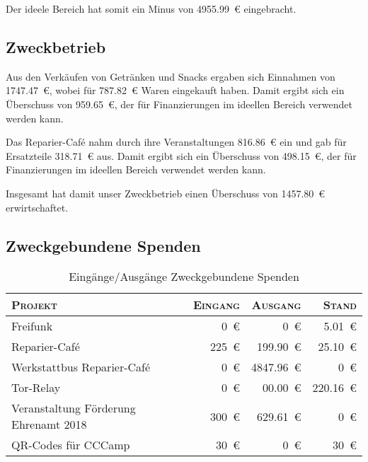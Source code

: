 \documentclass[ngerman]{scrartcl}
\begin{document}
Der ideele Bereich hat somit ein Minus von \num{4955.99}~\euro{} eingebracht.
\newpage
\subsection{Zweckbetrieb}
\label{sec:Zweckbetrieb}
Aus den Verkäufen von Getränken und Snacks ergaben sich Einnahmen von \num{1747,47}~\euro{}, wobei für \num{787,82}~\euro{} Waren eingekauft haben.
Damit ergibt sich ein Überschuss von \num{959,65}~\euro{}, der für Finanzierungen im ideellen Bereich verwendet werden kann.

Das Reparier-Café nahm durch ihre Veranstaltungen \num{816,86}~\euro{} ein und gab für Ersatzteile \num{318,71}~\euro{} aus.
Damit ergibt sich ein Überschuss von \num{498,15}~\euro{}, der für Finanzierungen im ideellen Bereich verwendet werden kann.

Insgesamt hat damit unser Zweckbetrieb einen Überschuss von \num{1457,80}~\euro{} erwirtschaftet.

\subsection{Zweckgebundene Spenden}
\label{sec:zweckgebundene_spenden}

\begin{table}[h]
        \centering
        \begin{tabular}{l|r|r|r}
        \toprule
        \textsc{Projekt} & \textsc{Eingang} & \textsc{Ausgang} & \textsc{Stand} \\
        \midrule
        Freifunk & \num{0}~\euro{} & \num{0}~\euro{} & \num{5,01}~\euro{} \\
        Reparier-Café & \num{225}~\euro{} & \num{199,90}~\euro{} & \num{25,10}~\euro{} \\
        Werkstattbus Reparier-Café & \num{0}~\euro{} & \num{4847,96}~\euro{} & \num{0}~\euro{} \\
        Tor-Relay & \num{0}~\euro{} & \num{00,00}~\euro{} & \num{220,16}~\euro{} \\
        Veranstaltung Förderung Ehrenamt 2018 & \num{300}~\euro{} & \num{629,61}~\euro{} & \num{0}~\euro{} \\
        QR-Codes für CCCamp & \num{30}~\euro{} & \num{0}~\euro{} & \num{30}~\euro{} \\
\bottomrule
        \end{tabular}
        \caption{Eingänge/Ausgänge Zweckgebundene Spenden}
        \label{table:spenden}
\end{table}
\end{document}
